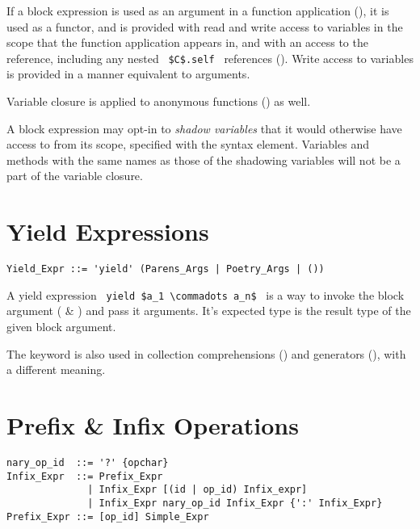 If a block expression is used as an argument in a function application (), it is used as a functor, and is provided with read and write access to variables in the scope that the function application appears in, and with an access to the  reference, including any nested ~\lstinline!$C$.self!~ references (). Write access to variables is provided in a manner equivalent to  arguments. 

Variable closure is applied to anonymous functions () as well. 

A block expression may opt-in to {\em shadow variables} that it would otherwise have access to from its scope, specified with the  syntax element. Variables and methods with the same names as those of the shadowing variables will not be a part of the variable closure. 





\section{Yield Expressions}

\syntax\begin{lstlisting}
Yield_Expr ::= 'yield' (Parens_Args | Poetry_Args | ())
\end{lstlisting}

A yield expression ~\lstinline!yield $a_1 \commadots a_n$!~ is a way to invoke the block argument ( \& ) and pass it arguments. It's expected type is the result type of the given block argument. 

The  keyword is also used in collection comprehensions () and generators (), with a different meaning. 





\section{Prefix \& Infix Operations}
\label{sec:prefix-infix-ops}

\syntax\begin{lstlisting}
nary_op_id  ::= '?' {opchar}
Infix_Expr  ::= Prefix_Expr
              | Infix_Expr [(id | op_id) Infix_expr]
              | Infix_Expr nary_op_id Infix_Expr {':' Infix_Expr}
Prefix_Expr ::= [op_id] Simple_Expr
\end{lstlisting}


